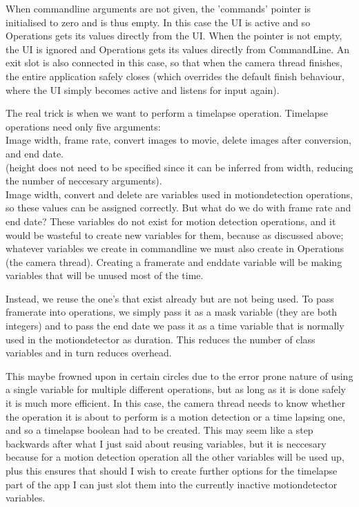 \documentclass[11pt]{article} %
\begin{document}
When commandline arguments are not given, the 'commands' pointer is initialised to zero and is thus empty. In this case the UI is active and so Operations gets its values directly from the UI. When the pointer is not empty, the UI is ignored and Operations gets its values directly from CommandLine. An exit slot is also connected in this case, so that when the camera thread finishes, the entire application safely closes (which overrides the default finish behaviour, where the UI simply becomes active and listens for input again).

The real trick is when we want to perform a timelapse operation. Timelapse operations need only five arguments:
\\ Image width, frame rate, convert images to movie,  delete images after conversion, and end date.\\
(height does not need to be specified since it can be inferred from width, reducing the number of neccesary arguments).\\
Image width, convert and delete are variables used in motiondetection operations, so these values can be assigned correctly. But what do we do with frame rate and end date? These variables do not exist for motion detection operations, and it would be wasteful to create new variables for them, because as discussed above; whatever variables we create in commandline we must also create in Operations (the camera thread). Creating a framerate and enddate variable will be making variables that will be unused most of the time.

Instead, we reuse the one's that exist already but are not being used. To pass framerate into operations, we simply pass it as a mask variable (they are both integers) and to pass the end date we pass it as a time variable that is normally used in the motiondetector as duration. This reduces the number of class variables and in turn reduces overhead.

This maybe frowned upon in certain circles due to the error prone nature of using a single variable for multiple different operations, but as long as it is done safely it is much more efficient. In this case, the camera thread needs to know whether the operation it is about to perform is a motion detection or a time lapsing one, and so a timelapse boolean had to be created. This may seem like a step backwards after what I just said about reusing variables, but it is neccesary because for a motion detection operation all the other variables will be used up, plus this ensures that should I wish to create further options for the timelapse part of the app I can just slot them into the currently inactive motiondetector variables.
\end{document}
